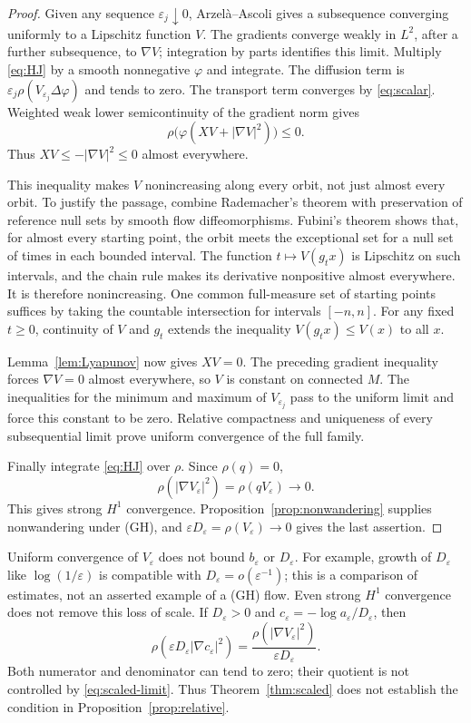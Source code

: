 \documentclass[11pt]{article}
\theoremstyle{definition}
\theoremstyle{remark}
\newcommand{\eps}{\varepsilon}
\begin{document}
\begin{proof}
Given any sequence $\eps_j\downarrow0$, Arzel\`a--Ascoli gives a subsequence converging uniformly to a Lipschitz function $V$. The gradients converge weakly in $L^2$, after a further subsequence, to $\nabla V$; integration by parts identifies this limit. Multiply \eqref{eq:HJ} by a smooth nonnegative $\varphi$ and integrate. The diffusion term is $\eps_j\rho(V_{\eps_j}\Delta\varphi)$ and tends to zero. The transport term converges by \eqref{eq:scalar}. Weighted weak lower semicontinuity of the gradient norm gives
\[
 \rho\big(\varphi(XV+|\nabla V|^2)\big)\le0.
\]
Thus $XV\le-|\nabla V|^2\le0$ almost everywhere.

This inequality makes $V$ nonincreasing along every orbit, not just almost every orbit. To justify the passage, combine Rademacher's theorem with preservation of reference null sets by smooth flow diffeomorphisms. Fubini's theorem shows that, for almost every starting point, the orbit meets the exceptional set for a null set of times in each bounded interval. The function $t\mapsto V(g_tx)$ is Lipschitz on such intervals, and the chain rule makes its derivative nonpositive almost everywhere. It is therefore nonincreasing. One common full-measure set of starting points suffices by taking the countable intersection for intervals $[-n,n]$. For any fixed $t\ge0$, continuity of $V$ and $g_t$ extends the inequality $V(g_tx)\le V(x)$ to all $x$.

Lemma~\ref{lem:Lyapunov} now gives $XV=0$. The preceding gradient inequality forces $\nabla V=0$ almost everywhere, so $V$ is constant on connected $M$. The inequalities for the minimum and maximum of $V_{\eps_j}$ pass to the uniform limit and force this constant to be zero. Relative compactness and uniqueness of every subsequential limit prove uniform convergence of the full family.

Finally integrate \eqref{eq:HJ} over $\rho$. Since $\rho(q)=0$,
\begin{equation}\label{eq:scaled-energy}
 \rho(|\nabla V_\eps|^2)=\rho(qV_\eps)\longrightarrow0.
\end{equation}
This gives strong $H^1$ convergence. Proposition~\ref{prop:nonwandering} supplies nonwandering under (GH), and $\eps D_\eps=\rho(V_\eps)\to0$ gives the last assertion.
\end{proof}

Uniform convergence of $V_\eps$ does not bound $b_\eps$ or $D_\eps$. For example, growth of $D_\eps$ like $\log(1/\eps)$ is compatible with $D_\eps=o(\eps^{-1})$; this is a comparison of estimates, not an asserted example of a (GH) flow. Even strong $H^1$ convergence does not remove this loss of scale. If $D_\eps>0$ and $c_\eps=-\log a_\eps/D_\eps$, then
\begin{equation}\label{eq:defect}
 \rho(\eps D_\eps|\nabla c_\eps|^2)
 =\frac{\rho(|\nabla V_\eps|^2)}{\eps D_\eps}.
\end{equation}
Both numerator and denominator can tend to zero; their quotient is not controlled by \eqref{eq:scaled-limit}. Thus Theorem~\ref{thm:scaled} does not establish the condition in Proposition~\ref{prop:relative}.
\end{document}
